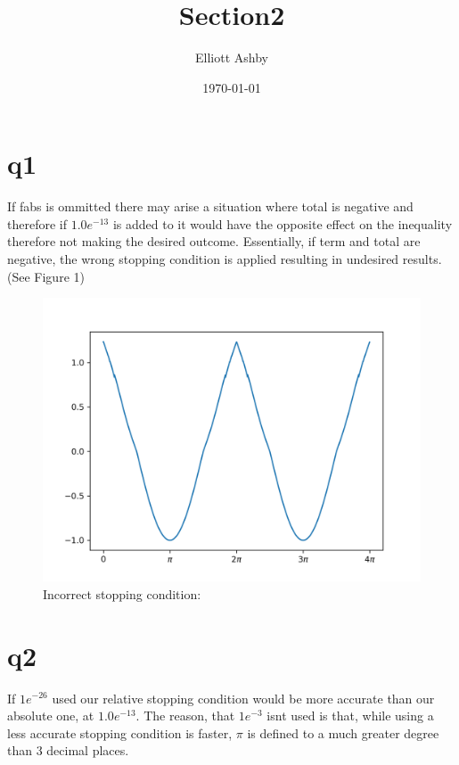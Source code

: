 \documentclass[a4paper,english]{article}
\title{Section2}
\author{Elliott Ashby}
\date{\today}
\begin{document}
    \maketitle
    \section{q1}
        If fabs is ommitted there may arise a situation where total is negative and therefore
        if $1.0e^{-13}$ is added to it would have the opposite effect on the inequality therefore
        not making the desired outcome. Essentially, if term and total are negative, the wrong 
        stopping condition is applied resulting in undesired results. (See Figure 1)
        \begin{figure}
            \caption{Incorrect stopping condition:}
            \includegraphics[scale=0.7]{./q1nofabs.png}
        \end{figure}
    \section{q2}
        If $1e^{-26}$ used our relative stopping condition would be more accurate than our absolute one, at $1.0e^{-13}$. The reason, that $1e^{-3}$ isnt used is that, while using a
        less accurate stopping condition is faster, $\pi$ is defined to a much greater degree than 3 decimal places.
\end{document}
